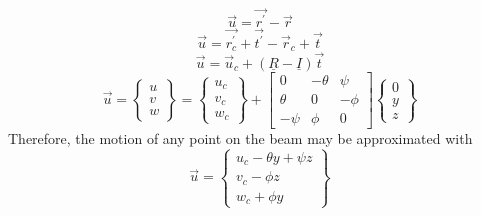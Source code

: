 \begin{equation}\label{eq:DispVectorrpr}
\vec{u}=\vec{r^\prime}-\vec{r}
\end{equation}
\begin{equation}\label{eq:DispVectorrptprt}
\vec{u}=\vec{r_c^\prime}+\vec{t^\prime}-\vec{r}_c+\vec{t}
\end{equation}
\begin{equation}\label{eq:DispVectRotTranst}
\vec{u}=\vec{u}_c+(\underline{R}-\underline{I})\vec{t}
\end{equation}
\begin{equation}\label{DispVectExpanded}
\vec{u} = \left\{\begin{array}{c}
	u\\
	v\\
	w\end{array}\right\}=\left\{\begin{array}{c}
	u_c\\
	v_c\\
	w_c\end{array}\right\}+\left[\begin{array}{ccc}
	0&-\theta&\psi\\
	\theta&0&-\phi\\
	-\psi&\phi&0
	\end{array}\right]\left\{\begin{array}{c}
	0\\
	y\\
	z\end{array}\right\}
\end{equation}
Therefore, the motion of any point on the beam may be approximated with
\begin{equation}\label{eq:DispVectEvaluated}
\vec{u}=\left\{\begin{array}{c}
u_c-\theta y+\psi z\\
v_c-\phi z\\
w_c+\phi y\end{array}\right\}
\end{equation}
